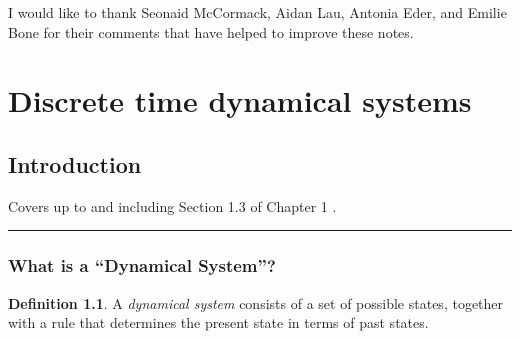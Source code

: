 \documentclass[
  a4paper,
  oneside,
  final]{krantz}
\theoremstyle{definition}
\newtheorem{definition}{Definition}[chapter]
\theoremstyle{definition}
\theoremstyle{definition}
\theoremstyle{definition}
\theoremstyle{remark}
\begin{document}
I would like to thank Seonaid McCormack, Aidan Lau, Antonia Eder, and Emilie Bone for their comments that have helped to improve these notes.

\hypertarget{part-discrete-time-dynamical-systems}{%
\part{Discrete time dynamical systems}\label{part-discrete-time-dynamical-systems}}

\hypertarget{intro}{%
\chapter{Introduction}\label{intro}}

Covers up to and including Section 1.3 of Chapter 1 \citep{ASY}.

\begin{center}\rule{0.5\linewidth}{0.5pt}\end{center}

\hypertarget{introtodynsys}{%
\section{What is a ``Dynamical System''?}\label{introtodynsys}}

\begin{definition}
\protect\hypertarget{def:dynsys}{}\label{def:dynsys}A \emph{dynamical system} consists of a set of possible states, together with a rule that determines the present state in terms of past states.
\end{definition}
\end{document}
